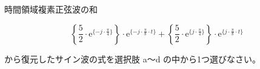 時間領域複素正弦波の和

\[
\left \{ \frac{5}{2} \cdot \textrm{e}^{\{-j \cdot \frac{\pi}{4} \}} \right \} \cdot \textrm{e}^{\{-j \cdot \frac{\pi}{8} \cdot t \}} +  
\left \{ \frac{5}{2} \cdot \textrm{e}^{\{ j \cdot \frac{\pi}{4} \}} \right \} \cdot \textrm{e}^{\{ j \cdot \frac{\pi}{8} \cdot t \}}
\]

\bigskip
\noindent から復元したサイン波の式を選択肢 a〜d の中から1つ選びなさい。
